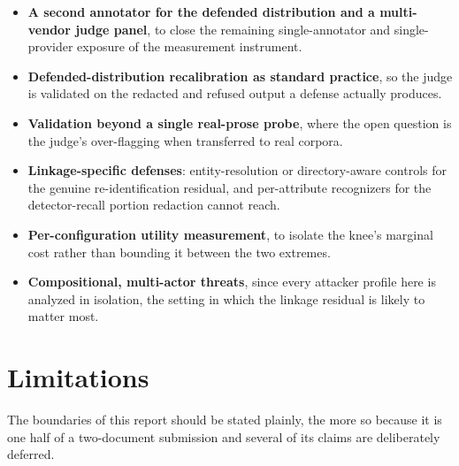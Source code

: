 \documentclass[12pt,a4paper]{report}
\begin{document}
\begin{itemize}[leftmargin=1.4em, itemsep=2pt]
  \item \textbf{A second annotator for the defended distribution and a multi-vendor judge
    panel}, to close the remaining single-annotator and single-provider exposure of the
    measurement instrument.
  \item \textbf{Defended-distribution recalibration as standard practice}, so the judge is
    validated on the redacted and refused output a defense actually produces.
  \item \textbf{Validation beyond a single real-prose probe}, where the open question is the
    judge's over-flagging when transferred to real corpora.
  \item \textbf{Linkage-specific defenses}: entity-resolution or directory-aware controls for
    the genuine re-identification residual, and per-attribute recognizers for the
    detector-recall portion redaction cannot reach.
  \item \textbf{Per-configuration utility measurement}, to isolate the knee's marginal cost
    rather than bounding it between the two extremes.
  \item \textbf{Compositional, multi-actor threats}, since every attacker profile here is
    analyzed in isolation, the setting in which the linkage residual is likely to matter most.
\end{itemize}

\section{Limitations}
\label{sec:concl-limitations}

The boundaries of this report should be stated plainly, the more so because it is one half of a
two-document submission and several of its claims are deliberately deferred.
\end{document}
